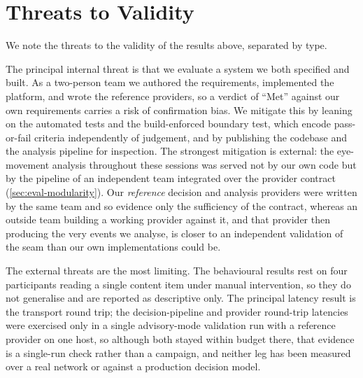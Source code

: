 \section{Threats to Validity}
\label{sec:eval-threats}

We note the threats to the validity of the results above, separated by type.

The principal internal threat is that we evaluate a system we both specified and built.
As a two-person team we authored the requirements, implemented the platform, and wrote the reference providers, so a verdict of ``Met'' against our own requirements carries a risk of confirmation bias.
We mitigate this by leaning on the automated tests and the build-enforced boundary test, which encode pass-or-fail criteria independently of judgement, and by publishing the codebase and the analysis pipeline for inspection.
The strongest mitigation is external: the eye-movement analysis throughout these sessions was served not by our own code but by the pipeline of an independent team integrated over the provider contract (\cref{sec:eval-modularity}).
Our \emph{reference} decision and analysis providers were written by the same team and so evidence only the sufficiency of the contract, whereas an outside team building a working provider against it, and that provider then producing the very events we analyse, is closer to an independent validation of the seam than our own implementations could be.

The external threats are the most limiting.
The behavioural results rest on four participants reading a single content item under manual intervention, so they do not generalise and are reported as descriptive only.
The principal latency result is the transport round trip; the decision-pipeline and provider round-trip latencies were exercised only in a single advisory-mode validation run with a reference provider on one host, so although both stayed within budget there, that evidence is a single-run check rather than a campaign, and neither leg has been measured over a real network or against a production decision model.

